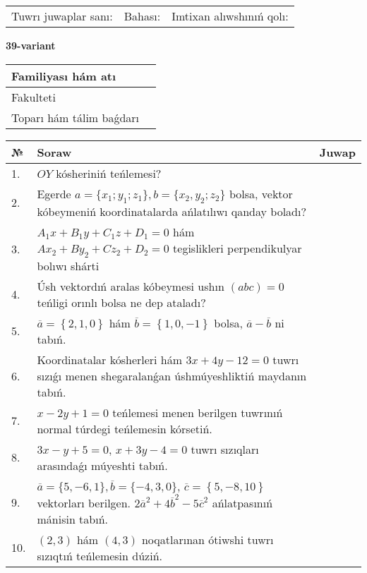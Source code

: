 \documentclass{article}
\begin{document}
\vspace{1cm}

\begin{tabular}{lll}
Tuwrı juwaplar sanı: \underline{\hspace{1.5cm}} & 
Bahası: \underline{\hspace{1.5cm}} & 
Imtixan alıwshınıń qolı: \underline{\hspace{2cm}} \\
\end{tabular}

\egroup

\newpage


\textbf{39-variant}\\

\bgroup
\def\arraystretch{1.6} %

\begin{tabular}{|m{5.7cm}|m{9.5cm}|}
\hline
Familiyası hám atı & \\
\hline
Fakulteti  & \\
\hline
Toparı hám tálim baǵdarı  & \\
\hline
\end{tabular}

\vspace{1cm}

\begin{tabular}{|m{0.7cm}|m{10cm}|m{4cm}|}
\hline
№ & Soraw & Juwap \\
\hline
1. & $OY$ kósheriniń teńlemesi? &  \\
\hline
2. & Egerde $a=\{ x_1; y_1; z_1\}, b=\{ x_2, y_2; z_2\}$ bolsa, vektor kóbeymeniń koordinatalarda ańlatılıwı qanday boladı? &  \\
\hline
3. & $A_1x+B_1y+C_1z+D_1=0$ hám $Ax_2+By_2+Cz_2+D_2=0$ tegislikleri perpendikulyar bolıwı shárti &  \\
\hline
4. & Úsh vektordıń aralas kóbeymesi ushın $(abc)=0$ teńligi orınlı bolsa ne dep ataladı? &  \\
\hline
5. & $\overline{a}=\left\{ 2, 1, 0 \right\}$ hám $\overline{b}=\left\{ 1, 0,-1 \right\}$ bolsa, $\overline{a}-\overline{b}$ ni tabıń. &  \\
\hline
6. & Koordinatalar kósherleri hám $ 3x+4y-12=0 $ tuwrı sızıǵı menen shegaralanǵan úshmúyeshliktiń maydanın tabıń. &  \\
\hline
7. & $x-2y+1=0$ teńlemesi menen berilgen tuwrınıń normal túrdegi teńlemesin kórsetiń. &  \\
\hline
8. & $3x-y+5=0$, $x+3y-4=0$ tuwrı sızıqları arasındaǵı múyeshti tabıń. &  \\
\hline
9. & $\overline{a}=\{5,-6, 1 \}, \overline{b}=\{-4, 3, 0 \} $, $\overline{c}=\left\{ 5,-8, 10 \right\}$ vektorları berilgen. $2{\overline{a}}^{2}+4{\overline{b}}^{2}-5{\overline{c}}^{2}$ ańlatpasınıń mánisin tabıń. &  \\
\hline
10. & $(2, 3)$ hám $(4, 3)$ noqatlarınan ótiwshi tuwrı sızıqtıń teńlemesin dúziń. &  \\
\hline
\end{tabular}
\end{document}
